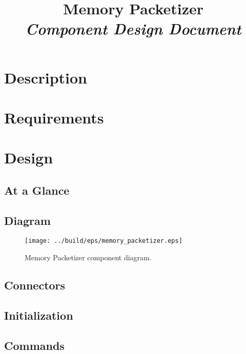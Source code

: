 



\title{\textbf{Memory Packetizer} \\
\large\textit{Component Design Document}}
\date{}
\maketitle

\section{Description}


\section{Requirements}


\section{Design}

\subsection{At a Glance}


\subsection{Diagram}
\begin{figure}[H]
  \texttt{[image: ../build/eps/memory\_packetizer.eps]}
  \caption{Memory Packetizer component diagram.}
\end{figure}

\subsection{Connectors}


\subsection{Initialization}


\subsection{Commands}

